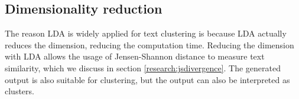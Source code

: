 \begin{comment}
An other notable representation is the \textit{term frequency inverse document matrix} (tf-idm) in topic modelling. Tf-idm increases the weight terms with less frequency have. This makes tf-idm more appealing when assuming infrequent terms are important. Because tf-idm already reduces the dimension of the terms, lda cannot use this matrix as input. 
\end{comment}

\subsection{Dimensionality reduction} \label{methodology:dimreduction}
The reason LDA is widely applied for text clustering is because LDA actually reduces the dimension, reducing the computation time. Reducing the dimension with LDA allows the usage of Jensen-Shannon distance to measure text similarity, which we discuss in section \ref{research:jsdivergence}. The generated output is also suitable for clustering, but the output can also be interpreted as clusters.

\begin{comment}

\section{Syslog}\label{methodology:syslog}
Syslogs are textual messages \cite{Stearley2004TowardsSyslogs} which contain the messages provided by the systems.


\section{Challenges}

\subsection{Natural Language Processing}


\subsection{Semantics}


\subsection{Sentiment analysis}


\subsection{Extract, Transform, Load}

\end{comment}


